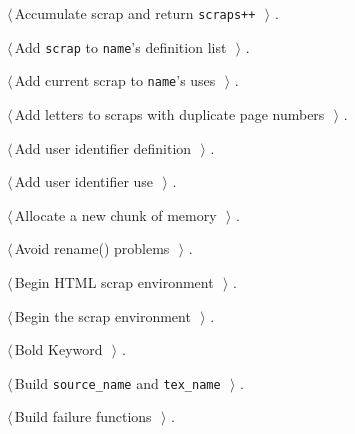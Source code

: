 \documentclass{report}
\begin{document}
{\small\begin{list}{}{\setlength{\itemsep}{-\parsep}\setlength{\itemindent}{-\leftmargin}}
\item $\langle\,$Accumulate scrap and return \verb|scraps++|\nobreak\ {\footnotesize {}}$\,\rangle$ {\footnotesize {\NWtxtRefIn} .}
\item $\langle\,$Add \verb|scrap| to \verb|name|'s definition list\nobreak\ {\footnotesize {}}$\,\rangle$ {\footnotesize {\NWtxtRefIn} .
}
\item $\langle\,$Add current scrap to \verb|name|'s uses\nobreak\ {\footnotesize {}}$\,\rangle$ {\footnotesize {\NWtxtRefIn} .
}
\item $\langle\,$Add letters to scraps with duplicate page numbers\nobreak\ {\footnotesize {}}$\,\rangle$ {\footnotesize {\NWtxtRefIn} .}
\item $\langle\,$Add user identifier definition\nobreak\ {\footnotesize {}}$\,\rangle$ {\footnotesize {\NWtxtRefIn} .}
\item $\langle\,$Add user identifier use\nobreak\ {\footnotesize {}}$\,\rangle$ {\footnotesize {\NWtxtRefIn} .}
\item $\langle\,$Allocate a new chunk of memory\nobreak\ {\footnotesize {}}$\,\rangle$ {\footnotesize {\NWtxtRefIn} .}
\item $\langle\,$Avoid rename() problems\nobreak\ {\footnotesize {}}$\,\rangle$ {\footnotesize {\NWtxtRefIn} .}
\item $\langle\,$Begin HTML scrap environment\nobreak\ {\footnotesize {}}$\,\rangle$ {\footnotesize {\NWtxtRefIn} .
}
\item $\langle\,$Begin the scrap environment\nobreak\ {\footnotesize {}}$\,\rangle$ {\footnotesize {\NWtxtRefIn} .
}
\item $\langle\,$Bold Keyword\nobreak\ {\footnotesize {}}$\,\rangle$ {\footnotesize {\NWtxtRefIn} .}
\item $\langle\,$Build \verb|source_name| and \verb|tex_name|\nobreak\ {\footnotesize {}}$\,\rangle$ {\footnotesize {\NWtxtRefIn} .}
\item $\langle\,$Build failure functions\nobreak\ {\footnotesize {}}$\,\rangle$ {\footnotesize {\NWtxtRefIn} .}

\end{list}}
\end{document}
